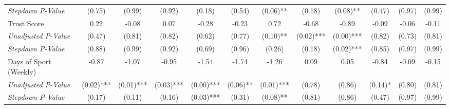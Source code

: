 \begin{tabular}{l c c c c c c c c c c c}
\quad \textit{Stepdown P-Value} & (0.75) & (0.99) & (0.92) & (0.18) & (0.54) & (0.06)** & (0.18) & (0.08)** & (0.47) & (0.97) & (0.99) \\
Trust Score & 0.22 & -0.08 & 0.07 & -0.28 & -0.23 & 0.72 & -0.68 & -0.89 & -0.09 & -0.06 & -0.11 \\
\quad \textit{Unadjusted P-Value} & (0.47) & (0.81) & (0.82) & (0.62) & (0.77) & (0.10)** & (0.02)*** & (0.00)*** & (0.82) & (0.73) & (0.81) \\
\quad \textit{Stepdown P-Value} & (0.88) & (0.99) & (0.92) & (0.69) & (0.96) & (0.26) & (0.18) & (0.02)*** & (0.85) & (0.97) & (0.99) \\
Days of Sport (Weekly) & -0.87 & -1.07 & -0.95 & -1.54 & -1.74 & -1.26 & 0.09 & 0.05 & -0.84 & -0.09 & -0.15 \\
\quad \textit{Unadjusted P-Value} & (0.02)*** & (0.01)*** & (0.03)*** & (0.00)*** & (0.06)** & (0.01)*** & (0.78) & (0.86) & (0.14)* & (0.80) & (0.81) \\
\quad \textit{Stepdown P-Value} & (0.17) & (0.11) & (0.16) & (0.03)*** & (0.31) & (0.08)** & (0.81) & (0.86) & (0.47) & (0.97) & (0.99) \\
\bottomrule
\end{tabular}
